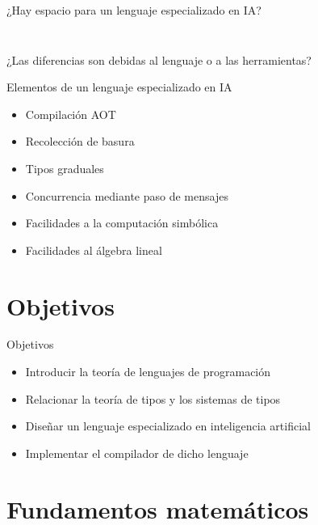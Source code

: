 \documentclass[compress]{beamer}
\begin{document}
\begin{frame}{¿Hay espacio para un lenguaje especializado en IA?}
\begin{columns}
\begin{column}{0.5\paperwidth}
\begin{figure}[h]
\begin{center}
				\end{center}
			\end{figure}
		\end{column}
	\end{columns}
	\bigskip
	\bigskip
	\centering
	¿Las diferencias son debidas al lenguaje o a las herramientas?
	\bigskip
	\bigskip
\end{frame}

\begin{frame}{Elementos de un lenguaje especializado en IA}
	\begin{itemize}
		\item Compilación AOT \\
		\bigskip
		\item Recolección de basura \\
		\bigskip
		\item Tipos graduales \\
		\bigskip
		\item Concurrencia mediante paso de mensajes \\
		\bigskip
		\item Facilidades a la computación simbólica \\
		\bigskip
		\item Facilidades al álgebra lineal \\
	\end{itemize}
\end{frame}

\section{Objetivos}
\begin{frame}{Objetivos}
	\begin{itemize}
		\item Introducir la teoría de lenguajes de programación\\
		\bigskip
		\item Relacionar la teoría de tipos y los sistemas de tipos\\
		\bigskip
		\item Diseñar un lenguaje especializado en inteligencia artificial\\
		\bigskip
		\item Implementar el compilador de dicho lenguaje\\
	\end{itemize}
\end{frame}

\section{Fundamentos matemáticos}
\end{document}
